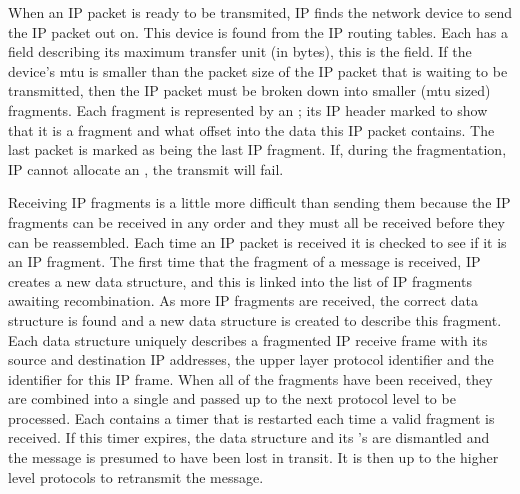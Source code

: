 When an IP packet is ready to be transmited, 
IP finds the network device to send the IP packet out on.
This device is found from the IP routing tables.
Each  has a field describing its maximum transfer unit (in bytes), this is 
the  field.
If the device's mtu is smaller than the packet size of the IP packet that is waiting to be
transmitted, then the IP packet must be broken down into smaller (mtu sized) fragments.
Each fragment is represented by an ; its IP header marked to show that it
is a fragment and what offset into the data this IP packet contains.
The last packet is marked as being the last IP fragment.
If, during the fragmentation, IP cannot allocate an , the transmit will
fail.

Receiving IP fragments is a little more difficult than sending them because the IP fragments
can be received in any order and they must all be received before they can
be reassembled.
Each time an IP packet is received 
it is checked to see if it is an IP fragment.
The first time that the fragment of a message is received, IP creates a new  data
structure, and this is linked into the  list of IP fragments
awaiting recombination.
As more IP fragments are received, the correct  data structure is found and a new 
data structure is created to describe this fragment.
Each  data structure uniquely describes a fragmented IP receive frame with its source and
destination IP addresses, the upper layer protocol identifier and the identifier for this IP
frame.
When all of the fragments have been received, they are combined into a single  and 
passed up to the next protocol level to be processed.
Each  contains a timer that is restarted each time a valid fragment is received.
If this timer expires, the  data structure and its 's are dismantled and the message
is presumed to have been lost in transit.
It is then up to the higher level protocols to retransmit the message.

